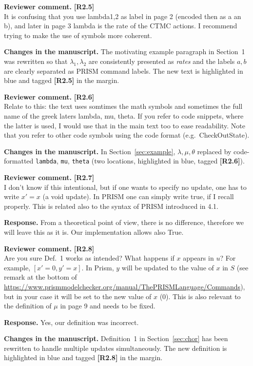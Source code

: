 \documentclass[11pt]{article}
\newcommand{\codeprism}[1]{\texttt{#1}}
\newcommand{\revcomment}[1]{%
  \begin{reviewercomment}
  \textbf{Reviewer comment.} #1
  \end{reviewercomment}
}
\newcommand{\revresponse}[2][]{%
  \par\noindent\textbf{Response.} #1 #2
}
\newcommand{\revchanges}[2][]{%
  \par\noindent\textbf{Changes in the manuscript.} #1
  #2\par\bigskip
}
\begin{document}
\revcomment{\textbf{[R2.5]}\\
It is confusing that you use lambda1,2 as label in page 2 (encoded
then as a an b), and later in page 3 lambda is the rate of the CTMC
actions. I recommend trying to make the use of symbols more coherent.
}

\revchanges{ The motivating example paragraph in Section~1 was
  rewritten so that $\lambda_1, \lambda_2$ are consistently
  presented as \emph{rates} and the labels $a, b$ are clearly
  separated as PRISM command labels. The new text is highlighted in
  blue and tagged \textbf{[R2.5]} in the margin.}

\revcomment{\textbf{[R2.6]}\\
Relate to this: the text uses somtimes the math symbols and
sometimes the full name of the greek laters lambda, mu, theta. If
you refer to code snippets, where the latter is used, I would use
that in the main text too to ease readability. Note that you refer
to other code symbols using the code format (e.g.\ CheckOutState).
}

\revchanges{ In Section~\ref{sec:example}, $\lambda, \mu, \theta$
  replaced by code-formatted \codeprism{lambda}, \codeprism{mu},
  \codeprism{theta} (two locations, highlighted in blue, tagged
  \textbf{[R2.6]}).}

\revcomment{\textbf{[R2.7]}\\
I don't know if this intentional, but if one wants to specify no
update, one has to write $x' = x$ (a void update). In PRISM one can
simply write true, if I recall properly. This is related also to
the syntax of PRISM introduced in 4.1.
}

\revresponse{
  From a theoretical point of view, there is no difference, therefore we will leave this as it is. Our implementation allows also True. 
}

\revcomment{\textbf{[R2.8]}\\
Are you sure Def.~1 works as intended? What happens if $x$ appears
in $u$? For example, $[x' = 0, y' = x]$. In Prism, $y$ will be
updated to the value of $x$ in $S$ (see remark at the bottom of
\url{https://www.prismmodelchecker.org/manual/ThePRISMLanguage/Commands}),
but in your case it will be set to the new value of $x$ (0). This
is also relevant to the definition of $\mu$ in page 9 and needs to
be fixed.
}

\revresponse{ Yes, our definition was incorrect. }

\revchanges{ Definition~1 in Section~\ref{sec:chor} has been
  rewritten to handle multiple updates simultaneously. The new
  definition is highlighted in blue and tagged \textbf{[R2.8]} in
  the margin.}
\end{document}
